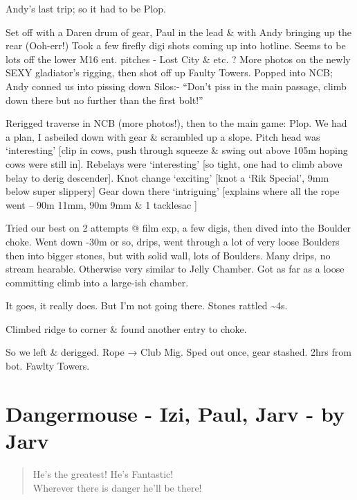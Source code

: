 Andy's last trip; so it had to be Plop.

Set off with a Daren drum of gear, Paul in the lead \& with Andy
bringing up the rear (Ooh-err!) Took a few firefly digi shots coming up
into hotline. Seems to be lots off the lower M16 ent. pitches - Lost
City \& etc. ? More photos on the newly SEXY gladiator's rigging, then
shot off up Faulty Towers. Popped into NCB; Andy conned us into pissing
down Silos:- ``Don't piss in the main passage, climb down there but no
further than the first bolt!''

Rerigged traverse in NCB (more photos!), then to the main game: Plop. We
had a plan, I asbeiled down with gear \& scrambled up a slope. Pitch
head was `interesting' {[}clip in cows, push through squeeze \& swing
out above 105m hoping cows were still in{]}. Rebelays were `interesting'
{[}so tight, one had to climb above belay to derig descender{]}. Knot
change `exciting' {[}knot a `Rik Special', 9mm below super slippery{]}
Gear down there `intriguing' {[}explains where all the rope went -- 90m
11mm, 90m 9mm \& 1 tacklesac {]}

Tried our best on 2 attempts @ film exp, a few digis, then dived into
the Boulder choke. Went down -30m or so, drips, went through a lot of
very loose Boulders then into bigger stones, but with solid wall, lots
of Boulders. Many drips, no stream hearable. Otherwise very similar to
Jelly Chamber. Got as far as a loose committing climb into a large-ish
chamber.

It goes, it really does. But I'm not going there. Stones rattled
\textasciitilde{}4s.

Climbed ridge to corner \& found another entry to choke.

So we left \& derigged. Rope → Club Mig. Sped out once, gear stashed.
2hrs from bot. Fawlty Towers.


\section{Dangermouse - Izi, Paul, Jarv - by
Jarv}\label{dangermouse---izi-paul-jarv---by-jarv}

\begin{verse}
He's the greatest! He's Fantastic!\\
Wherever there is danger he'll be there!
\end{verse}


